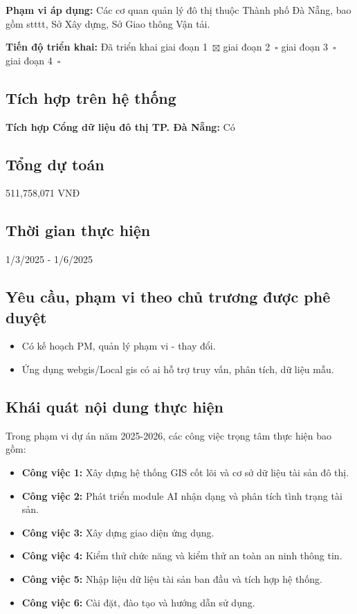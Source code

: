 \noindent \textbf{Phạm vi áp dụng:} Các cơ quan quản lý đô thị thuộc Thành phố Đà Nẵng, bao gồm \gls{stttt}, Sở Xây dựng, Sở Giao thông Vận tải.

\vspace{0.2cm}
\noindent \textbf{Tiến độ triển khai:} 
Đã triển khai giai đoạn 1~$\boxtimes$ \quad 
giai đoạn 2~$\square$ \quad 
giai đoạn 3~$\square$ \quad 
giai đoạn 4~$\square$ 

\subsection{Tích hợp trên hệ thống}
\textbf{Tích hợp Cổng dữ liệu đô thị TP. Đà Nẵng:} Có

\subsection{Tổng dự toán}
511,758,071 VNĐ

\subsection{Thời gian thực hiện}
1/3/2025 - 1/6/2025

\subsection{Yêu cầu, phạm vi theo chủ trương được phê duyệt}
\begin{itemize}
    \item Có kế hoạch PM, quản lý phạm vi - thay đổi.
    \item Ứng dụng \gls{webgis}/Local \gls{gis} có \gls{ai} hỗ trợ truy vấn, phân tích, dữ liệu mẫu.
\end{itemize}
\subsection{Khái quát nội dung thực hiện}
Trong phạm vi dự án năm 2025-2026, các công việc trọng tâm thực hiện bao gồm:
\begin{itemize}
    \item \textbf{Công việc 1:}  Xây dựng hệ thống GIS cốt lõi và cơ sở dữ liệu tài sản đô thị.
    \item \textbf{Công việc 2:} Phát triển module AI nhận dạng và phân tích tình trạng tài sản.
    \item \textbf{Công việc 3:} Xây dựng giao diện ứng dụng.
    \item \textbf{Công việc 4:} Kiểm thử chức năng và kiểm thử an toàn an ninh thông tin.
    \item \textbf{Công việc 5:} Nhập liệu dữ liệu tài sản ban đầu và tích hợp hệ thống.
    \item \textbf{Công việc 6:} Cài đặt, đào tạo và hướng dẫn sử dụng.
\end{itemize}

